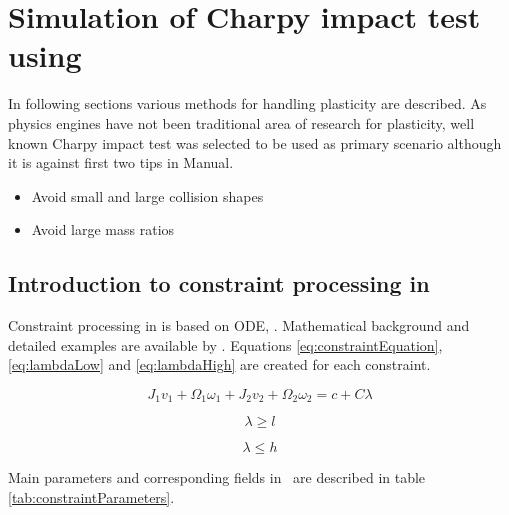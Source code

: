 \section{Simulation of Charpy impact test using \bullet}
\label{sec:bullet-charpy}

In following sections various methods for handling plasticity are described.
As physics engines have not been traditional area of research for plasticity, 
well known Charpy impact test was selected to be used as primary scenario
although it is against first two tips in \bullet Manual.

\begin{itemize}
\item Avoid small and large collision shapes
\item Avoid large mass ratios
\end{itemize}

\subsection{Introduction to constraint processing in \bullet}
Constraint processing in \bullet is based on ODE, \cite{ode}.
Mathematical background and detailed examples are available by \cite{ode.joints}.
Equations \ref{eq:constraintEquation}, \ref{eq:lambdaLow} and
\ref{eq:lambdaHigh} 
are created for each constraint.

\begin{equation} \label{eq:constraintEquation}
J_1 v_1 + \Omega_1 \omega_1 + J_2 v_2 + \Omega_2 \omega_2 = c + C \lambda
\end{equation}

\begin{equation} \label{eq:lambdaLow}
\lambda \geq l
\end{equation}

\begin{equation} \label{eq:lambdaHigh}
\lambda \leq h
\end{equation}

Main parameters  and corresponding fields in \bullet\  
 are described in table \ref{tab:constraintParameters}.

